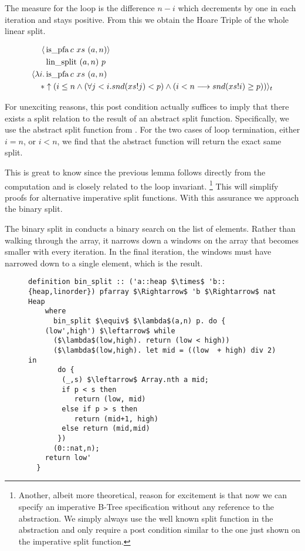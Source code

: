 The measure for the loop is the difference $n-i$ which
decrements by one in each iteration and stays positive.
From this we obtain the Hoare Triple of the whole linear split.

\begin{lemma}
    \begin{align*}
        \langle &\operatorname{is\_pfa} c\ xs\ (a,n)\rangle \\
                  &\operatorname{lin\_split}\ (a,n)\ p \\
        \langle \lambda i. & \operatorname{is\_pfa} c\ xs\ (a,n) \\
        * &\uparrow(i \leq n 
            \wedge (\forall j < i. snd (xs!j) < p) 
            \wedge (i<n \longrightarrow snd (xs!i) \geq p)) \rangle_t 
    \end{align*}
\end{lemma}

For unexciting reasons, this post condition
actually suffices to imply that there exists a split relation
to the result of an abstract split function.
Specifically, we use the abstract split function from
. %
For the two cases of loop termination,
either $i = n$, or $i < n$, we find that
the abstract function will return the exact same split.

This is great to know since the previous lemma
follows directly from the computation and is closely related
to the loop invariant.
\footnote{Another, albeit more theoretical,
reason for excitement is that now we can specify an imperative B-Tree
specification without any reference to the abstraction.
We simply always use the well known split function in the abstraction
and only require a post condition similar to the one just shown
on the imperative split function.}
This will simplify proofs for alternative imperative split functions.
With this assurance we approach the binary split.

The binary split in  conducts a binary search on
the list of elements.
Rather than walking through the array,
it narrows down a windows on the array that becomes smaller with
every iteration.
In the final iteration,
the windows must have narrowed down to a single element,
which is the result.

\begin{figure}
\begin{lstlisting}[mathescape=true, language=Isabelle, caption={The imperative binary split},
    label={lst:imp-binary-split}]
    definition bin_split :: ('a::heap $\times$ 'b::{heap,linorder}) pfarray $\Rightarrow$ 'b $\Rightarrow$ nat Heap 
    where 
      bin_split $\equiv$ $\lambda$(a,n) p. do { 
    (low',high') $\leftarrow$ while  
      ($\lambda$(low,high). return (low < high))  
      ($\lambda$(low,high). let mid = ((low  + high) div 2) in 
       do { 
        (_,s) $\leftarrow$ Array.nth a mid; 
        if p < s then 
           return (low, mid) 
        else if p > s then 
           return (mid+1, high) 
        else return (mid,mid) 
       })  
      (0::nat,n); 
    return low' 
  }
\end{lstlisting}
\end{figure}


